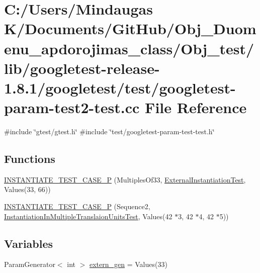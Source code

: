 \hypertarget{_obj__test_2lib_2googletest-release-1_88_81_2googletest_2test_2googletest-param-test2-test_8cc}{}\section{C\+:/\+Users/\+Mindaugas K/\+Documents/\+Git\+Hub/\+Obj\+\_\+\+Duomenu\+\_\+apdorojimas\+\_\+class/\+Obj\+\_\+test/lib/googletest-\/release-\/1.8.1/googletest/test/googletest-\/param-\/test2-\/test.cc File Reference}
\label{_obj__test_2lib_2googletest-release-1_88_81_2googletest_2test_2googletest-param-test2-test_8cc}
{\ttfamily \#include \char`\"{}gtest/gtest.\+h\char`\"{}}\newline
{\ttfamily \#include \char`\"{}test/googletest-\/param-\/test-\/test.\+h\char`\"{}}\newline
\subsection*{Functions}
\begin{DoxyCompactItemize}
\item 
\mbox{\hyperlink{_obj__test_2lib_2googletest-release-1_88_81_2googletest_2test_2googletest-param-test2-test_8cc_a433ad86af147648bc394f0f37016f336}{I\+N\+S\+T\+A\+N\+T\+I\+A\+T\+E\+\_\+\+T\+E\+S\+T\+\_\+\+C\+A\+S\+E\+\_\+P}} (Multiples\+Of33, \mbox{\hyperlink{class_external_instantiation_test}{External\+Instantiation\+Test}}, Values(33, 66))
\item 
\mbox{\hyperlink{_obj__test_2lib_2googletest-release-1_88_81_2googletest_2test_2googletest-param-test2-test_8cc_a06b097d2f2746a785ab07df0cc2e80a2}{I\+N\+S\+T\+A\+N\+T\+I\+A\+T\+E\+\_\+\+T\+E\+S\+T\+\_\+\+C\+A\+S\+E\+\_\+P}} (Sequence2, \mbox{\hyperlink{class_instantiation_in_multiple_translaion_units_test}{Instantiation\+In\+Multiple\+Translaion\+Units\+Test}}, Values(42 $\ast$3, 42 $\ast$4, 42 $\ast$5))
\end{DoxyCompactItemize}
\subsection*{Variables}
\begin{DoxyCompactItemize}
\item 
Param\+Generator$<$ int $>$ \mbox{\hyperlink{_obj__test_2lib_2googletest-release-1_88_81_2googletest_2test_2googletest-param-test2-test_8cc_a0f691f1461778d71f30b1fb1dea1cb50}{extern\+\_\+gen}} = Values(33)
\end{DoxyCompactItemize}


